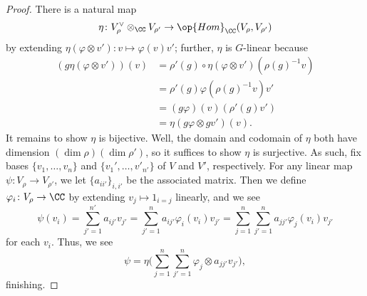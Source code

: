 \documentclass{article}
\begin{document}
\begin{proof}
	There is a natural map
	\[\eta\colon V_\rho^\lor\otimes_\CC V_{\rho'}\to\op{Hom}_\CC(V_\rho,V_{\rho'})\]
	by extending $\eta(\varphi\otimes v')\colon v\mapsto\varphi(v)v'$; further, $\eta$ is $G$-linear because
	\begin{align*}
		(g\eta(\varphi\otimes v'))(v) &= \rho'(g)\circ\eta(\varphi\otimes v')\left(\rho(g)^{-1}v\right) \\
		&= \rho'(g)\varphi\left(\rho(g)^{-1}v\right)v' \\
		&= (g\varphi)(v)(\rho'(g)v') \\
		&= \eta(g\varphi\otimes gv')(v).
	\end{align*}
	It remains to show $\eta$ is bijective. Well, the domain and codomain of $\eta$ both have dimension $(\dim\rho)(\dim\rho')$, so it suffices to show $\eta$ is surjective. As such, fix bases $\{v_1,\ldots,v_n\}$ and $\{v_1',\ldots,v'_{n'}\}$ of $V$ and $V'$, respectively. For any linear map $\psi\colon V_\rho\to V_{\rho'}$, we let $\{a_{ii'}\}_{i,i'}$ be the associated matrix. Then we define $\varphi_{i}\colon V_\rho\to\CC$ by extending $v_j\mapsto1_{i=j}$ linearly, and we see
	\[\psi(v_i)=\sum_{j'=1}^{n'}a_{ij'}v_{j'}=\sum_{j'=1}^na_{ij'}\varphi_{i}(v_i)v_{j'}=\sum_{j=1}^n\sum_{j'=1}^na_{jj'}\varphi_{j}(v_i)v_{j'}\]
	for each $v_i$. Thus, we see
	\[\psi=\eta\Bigg(\sum_{j=1}^n\sum_{j'=1}^n\varphi_{j}\otimes a_{jj'}v_{j'}\Bigg),\]
	finishing.
\end{proof}
\end{document}
